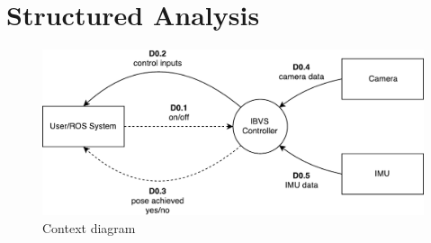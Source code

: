 
\section{Structured Analysis}
\label{sec:sa}

\begin{figure}[h]
	\centering
	\includegraphics[width=\textwidth]{content/chapter_03/images/sa_diagram_01_01.pdf}
	\caption{Context diagram}
	\label{fig:sa_diag_01}
\end{figure}

